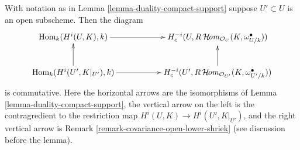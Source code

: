 \begin{lemma}
\label{lemma-duality-compact-support-restrict-open}
With notation as in Lemma \ref{lemma-duality-compact-support}
suppose $U' \subset U$ is an open subscheme. Then the diagram
$$
\xymatrix{
\Hom_k(H^i(U, K), k) \ar[rr] & &
H^{-i}_c(U, R\SheafHom_{\mathcal{O}_U}(K, \omega_{U/k}^\bullet)) \\
\Hom_k(H^i(U', K|_{U'}), k) \ar[rr] \ar[u] & &
H^{-i}_c(U', R\SheafHom_{\mathcal{O}_{U'}}(K, \omega_{U'/k}^\bullet)) \ar[u]
}
$$
is commutative. Here the horizontal arrows are the isomorphisms of
Lemma \ref{lemma-duality-compact-support}, the vertical arrow on the
left is the contragredient to the restriction map
$H^i(U, K) \to H^i(U', K|_{U'})$, and the right vertical arrow
is Remark \ref{remark-covariance-open-lower-shriek} (see discussion
before the lemma).
\end{lemma}

